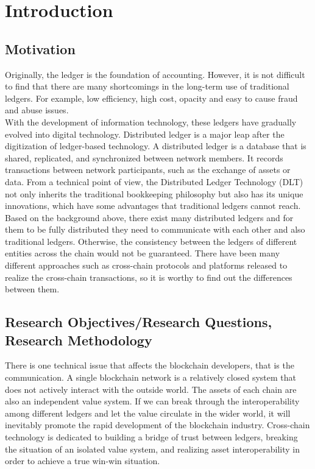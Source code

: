 \chapter{Introduction}
\label{chap:1}




\section{Motivation}

\noindent Originally, the ledger is the foundation of accounting. However, it is not difficult to find that there are many shortcomings in the long-term use of traditional ledgers. For example, low efficiency, high cost, opacity and easy to cause fraud and abuse issues.\\

\noindent With the development of information technology, these ledgers have gradually evolved into digital technology. Distributed ledger is a major leap after the digitization of ledger-based technology. A distributed ledger is a database that is shared, replicated, and synchronized between network members\cite{brakeville2016blockchain}. It records transactions between network participants, such as the exchange of assets or data. From a technical point of view, the Distributed Ledger Technology (DLT) not only inherits the traditional bookkeeping philosophy but also has its unique innovations, which have some advantages that traditional ledgers cannot reach.\\

\noindent Based on the background above, there exist many distributed ledgers and for them to be fully distributed they need to communicate with each other and also traditional ledgers. Otherwise, the consistency between the ledgers of different entities across the chain would not be guaranteed. There have been many different approaches such as cross-chain protocols and platforms released to realize the cross-chain transactions, so it is worthy to find out the differences between them.


\section{Research Objectives/Research Questions, Research Methodology}

\noindent There is one technical issue that affects the blockchain developers, that is the communication. A single blockchain network is a relatively closed system that does not actively interact with the outside world. The assets of each chain are also an independent value system. If we can break through the interoperability among different ledgers and let the value circulate in the wider world, it will inevitably promote the rapid development of the blockchain industry. Cross-chain technology is dedicated to building a bridge of trust between ledgers, breaking the situation of an isolated value system, and realizing asset interoperability in order to achieve a true win-win situation.\\

